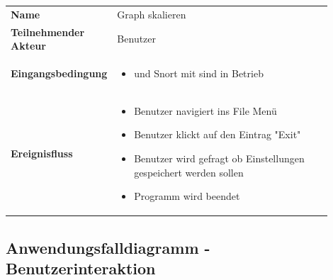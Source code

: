 \begin{tabular}{lp{0.9\linewidth}}
\textbf{Name} & Graph skalieren \\

\textbf{Teilnehmender Akteur} & Benutzer \\

\textbf{Eingangsbedingung} &
				\begin{minipage}[t]{\linewidth}
				\begin{itemize}[nosep,after=\strut,leftmargin=10pt]
				
				\item \programname und Snort mit \sppname sind in Betrieb

				\end{itemize}
				\end{minipage} \\
\textbf{Ereignisfluss} &
				\begin{minipage}[t]{\linewidth}
				\begin{itemize}[nosep,after=\strut,leftmargin=10pt]
				\item Benutzer navigiert ins File Menü
				\item Benutzer klickt auf den Eintrag "Exit"
				\item Benutzer wird gefragt ob Einstellungen gespeichert werden sollen
				\item Programm wird beendet
				\end{itemize}
				\end{minipage} \\
\end{tabular}


\pagebreak
\subsection*{Anwendungsfalldiagramm - Benutzerinteraktion}


